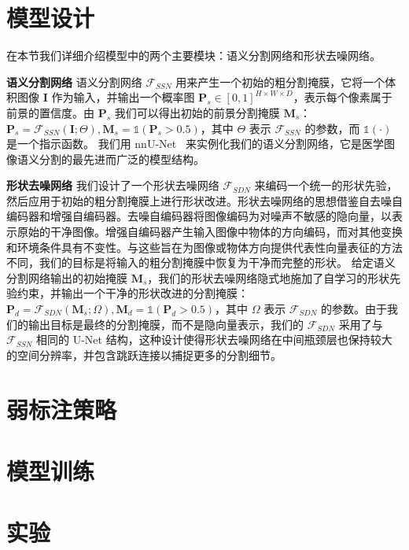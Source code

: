\section{模型设计}
在本节我们详细介绍模型中的两个主要模块：语义分割网络和形状去噪网络。

\textbf{语义分割网络} 语义分割网络 $\mathcal{F}_{SSN}$ 用来产生一个初始的粗分割掩膜，它将一个体积图像 $\mathbf{I}$ 作为输入，并输出一个概率图 $\mathbf{P}_s \in [0,1]^{H\times W\times D}$，表示每个像素属于前景的置信度。由 $\mathbf{P}_s$ 我们可以得出初始的前景分割掩膜 $\mathbf{M}_s$：$\mathbf{P}_s = \mathcal{F}_{SSN} (\mathbf{I}; \Theta), \mathbf{M}_s = \mathds{1} (\mathbf{P}_s > 0.5)$，其中 $\Theta$ 表示 $\mathcal{F}_{SSN}$ 的参数，而 $\mathds{1}(\cdot)$ 是一个指示函数。
我们用 nnU-Net~\citep{isensee2019automated} 来实例化我们的语义分割网络，它是医学图像语义分割的最先进而广泛的模型结构。


\textbf{形状去噪网络} 我们设计了一个形状去噪网络 $\mathcal{F}_{SDN}$ 来编码一个统一的形状先验，然后应用于初始的粗分割掩膜上进行形状改进。形状去噪网络的思想借鉴自去噪自编码器\citep{vincent2010stacked}和增强自编码器\citep{Sundermeyer_2018_ECCV}。去噪自编码器将图像编码为对噪声不敏感的隐向量，以表示原始的干净图像。增强自编码器产生输入图像中物体的方向编码，而对其他变换和环境条件具有不变性。与这些旨在为图像或物体方向提供代表性向量表征的方法不同，我们的目标是将输入的粗分割掩膜中恢复为干净而完整的形状。
给定语义分割网络输出的初始掩膜 $\mathbf{M}_s$，我们的形状去噪网络隐式地施加了自学习的形状先验约束，并输出一个干净的形状改进的分割掩膜：$\mathbf{P}_d = \mathcal{F}_{SDN} (\mathbf{M}_s; \Omega), \mathbf{M}_d = \mathds{1} (\mathbf{P}_d > 0.5)$，其中 $\Omega$ 表示 $\mathcal{F}_{SDN}$ 的参数。由于我们的输出目标是最终的分割掩膜，而不是隐向量表示，我们的 $\mathcal{F}_{SDN}$ 采用了与 $\mathcal{F}_{SSN}$ 相同的 U-Net 结构，这种设计使得形状去噪网络在中间瓶颈层也保持较大的空间分辨率，并包含跳跃连接以捕捉更多的分割细节。

\section{弱标注策略}



\section{模型训练}



\section{实验}



